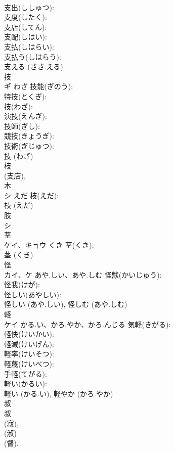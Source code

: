 \documentclass[8pt]{extreport}
\begin{document}
\begin{CJK}{UTF8}{min}
\\	支出(ししゅつ): 
\\	支度(したく): 
\\	支店(してん): 
\\	支配(しはい): 
\\	支払(しはらい): 
\\	支払う(しはらう): 
\\	支える (ささ.える)
\\	技			
\\	ギ	わざ	技能(ぎのう): 
\\	特技(とくぎ): 
\\	技(わざ): 
\\	演技(えんぎ): 
\\	技師(ぎし): 
\\	競技(きょうぎ): 
\\	技術(ぎじゅつ): 
\\	技 (わざ)
\\	枝			
\\	(支店), 
\\	木 
\\	シ	えだ	枝(えだ): 
\\	枝 (えだ)
\\	肢			
\\	シ			
\\	茎			
\\	ケイ、キョウ	くき	茎(くき): 
\\	茎 (くき)
\\	怪			
\\	カイ、ケ	あや.しい、あや.しむ	怪獣(かいじゅう): 
\\	怪我(けが): 
\\	怪しい(あやしい): 
\\	怪しい (あや.しい), 怪しむ (あや.しむ)
\\	軽			
\\	ケイ	かる.い、かろ.やか、かろ.んじる	気軽(きがる): 
\\	軽快(けいかい): 
\\	軽減(けいげん): 
\\	軽率(けいそつ): 
\\	軽蔑(けいべつ): 
\\	手軽(てがる): 
\\	軽い(かるい): 
\\	軽い (かる.い), 軽やか (かろ.やか)
\\	叔			
\\	叔 
\\	(寂), 
\\	(淑) 
\\	(督). 

\end{CJK}
\end{document}
